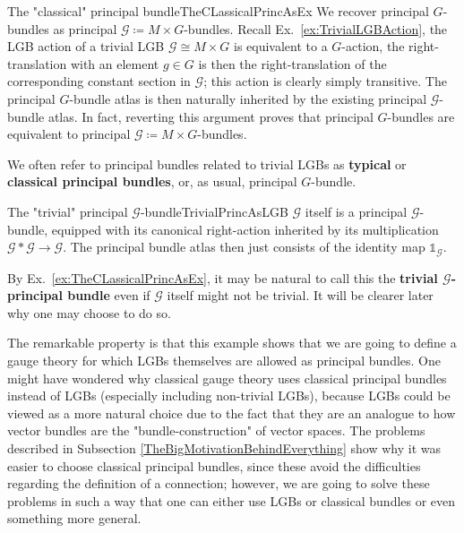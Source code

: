 \documentclass[a4paper,oneside,11pt,bibliography=totoc]{scrartcl}
\theoremstyle{plain}
\theoremstyle{remark}
\theoremstyle{definition}
\begin{document}
\begin{examples}{The "classical" principal bundle}{TheCLassicalPrincAsEx}
We recover principal $G$-bundles as principal $\mathcal{G} \coloneqq M \times G$-bundles. Recall Ex.\ \ref{ex:TrivialLGBAction}, the LGB action of a trivial LGB $\mathcal{G} \cong M \times G$ is equivalent to a $G$-action, the right-translation with an element $g \in G$ is then the right-translation of the corresponding constant section in $\mathcal{G}$; this action is clearly simply transitive. The principal $G$-bundle atlas is then naturally inherited by the existing principal $\mathcal{G}$-bundle atlas. In fact, reverting this argument proves that principal $G$-bundles are equivalent to principal $\mathcal{G} \coloneqq M \times G$-bundles.

We often refer to principal bundles related to trivial LGBs as \textbf{typical} or \textbf{classical principal bundles}, or, as usual, principal $G$-bundle. 
\end{examples}

\begin{examples}{The "trivial" principal $\mathcal{G}$-bundle}{TrivialPrincAsLGB}
$\mathcal{G}$ itself is a principal $\mathcal{G}$-bundle, equipped with its canonical right-action inherited by its multiplication $\mathcal{G}*\mathcal{G} \to \mathcal{G}$. The principal bundle atlas then just consists of the identity map $\mathds{1}_{\mathcal{G}}$.

By Ex.\ \ref{ex:TheCLassicalPrincAsEx}, it may be natural to call this the \textbf{trivial $\mathcal{G}$-principal bundle} even if $\mathcal{G}$ itself might not be trivial. It will be clearer later why one may choose to do so.

The remarkable property is that this example shows that we are going to define a gauge theory for which LGBs themselves are allowed as principal bundles. One might have wondered why classical gauge theory uses classical principal bundles instead of LGBs (especially including non-trivial LGBs), because LGBs could be viewed as a more natural choice due to the fact that they are an analogue to how vector bundles are the "bundle-construction" of vector spaces. The problems described in Subsection \ref{TheBigMotivationBehindEverything} show why it was easier to choose classical principal bundles, since these avoid the difficulties regarding the definition of a connection; however, we are going to solve these problems in such a way that one can either use LGBs or classical bundles or even something more general.
\end{examples}
\end{document}
